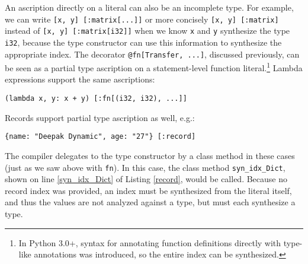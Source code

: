 \documentclass[9pt,preprint]{sigplanconf}
\newcommand{\lstinlinep}[1]{\lstinline[language=Python,basicstyle=\ttfamily\small]{#1}}
\begin{document}
An ascription directly on a literal can also be an incomplete type. For example, we can write \lstinline[basicstyle=\ttfamily\small]{[x, y] [:matrix[...]]} or more concisely \lstinline[basicstyle=\ttfamily\small]{[x, y] [:matrix]} instead of \lstinline[basicstyle=\ttfamily\small]{[x, y] [:matrix[i32]]} when we know \lstinline[basicstyle=\ttfamily\small]{x} and \lstinline[basicstyle=\ttfamily\small]{y} synthesize the type \lstinline[basicstyle=\ttfamily\small]{i32}, because the type constructor can use this information to synthesize the appropriate index. The decorator \lstinline[basicstyle=\ttfamily\small]{@fn[Transfer, ...]}, discussed previously, can be seen as a partial type ascription on a statement-level function literal.\footnote{In Python 3.0+, syntax for annotating function definitions directly with type-like annotations was introduced, so the entire index can be synthesized.} Lambda expressions support the same ascriptions:
\vspace{3px}
\begin{lstlisting}[numbers=none, basicstyle=\ttfamily\scriptsize]
(lambda x, y: x + y) [:fn[(i32, i32), ...]]
\end{lstlisting}
\noindent
Records support partial type ascription as well, e.g.: 
\vspace{3px}
\begin{lstlisting}[numbers=none,basicstyle=\ttfamily\scriptsize]
{name: "Deepak Dynamic", age: "27"} [:record]
\end{lstlisting}
\noindent
The compiler delegates to the type constructor by a class method in these cases (just as we saw above with \lstinlinep{fn}). In this case, the class method \lstinlinep{syn_idx_Dict}, shown on line \ref{syn_idx_Dict} of Listing \ref{record}, would be called. Because no record index was provided, an index must be synthesized from the literal itself, and thus the values are not analyzed against a type, but must each synthesize a type.
\end{document}
